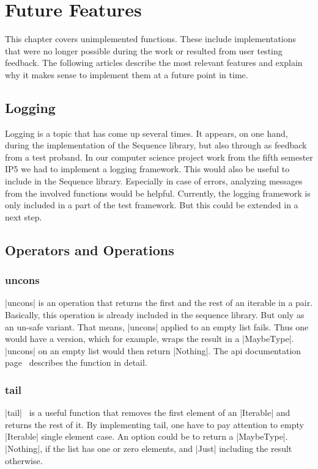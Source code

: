 \section{Future Features}
\label{sec:Future Features}
This chapter covers unimplemented functions. These include implementations that
were no longer possible during the work or resulted from user testing feedback.
The following articles describe the most relevant features and explain why it
makes sense to implement them at a future point in time.

\subsection{Logging}
\label{sub:Logging}
Logging is a topic that has come up several times. It appears, on one hand,
during the implementation of the Sequence library, but also through as feedback
from a test proband. In our computer science project work from the fifth
semester IP5 we had to implement a logging framework. This would also be useful
to include in the Sequence library. Especially in case of errors, analyzing
messages from the involved functions would be helpful. Currently, the logging
framework is only included in a part of the test framework. But this could be
extended in a next step.

\subsection{Operators and Operations}
\label{sub:Operators and Operations}

\subsubsection{uncons}
\label{subsub:uncons}
|uncons| is an operation that returns the first and the rest of an iterable in a
pair. Basically, this operation is already included in the sequence library.
But only as an un-safe variant. That means, |uncons| applied to an empty list
fails. Thus one would have a version, which for example, wraps the result in a
|MaybeType|. |uncons| on an empty list would then return |Nothing|. The
api documentation page~\cite{hoogle_uncons} describes the function in detail.

\subsubsection{tail}
\label{subsub:tail}
|tail|~\cite{hoogle_tail} is a useful function that removes the first element of an |Iterable|
and returns the rest of it. By implementing tail, one have to pay attention to
empty |Iterable| single element case. An option could be to return a
|MaybeType|. |Nothing|, if the list has one or zero elements, and
|Just| including the result otherwise.

